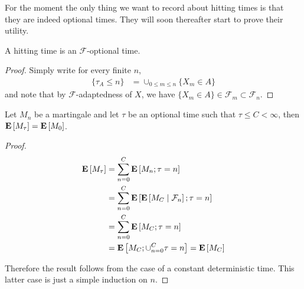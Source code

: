 For the moment the only thing we want to record about hitting times is
that they are indeed optional times.  They will soon thereafter start to prove their utility.
\begin{lem}\label{HittingTimesDiscrete}A hitting time is an
  $\mathcal{F}$-optional time.
\end{lem}
\begin{proof}
Simply write for every finite $n$,
\begin{align*}
\lbrace \tau_A \leq n \rbrace &= \cup_{0 \leq m \leq n} \lbrace X_m
\in A \rbrace
\end{align*}
and note that by $\mathcal{F}$-adaptedness of $X$, we have $\lbrace X_m
\in A \rbrace \in \mathcal{F}_m \subset \mathcal{F}_n$.
\end{proof}

\begin{lem}\label{ExpectationStoppedMartingaleDiscrete}Let $M_n$ be a martingale and let $\tau$ be an optional
  time such that $\tau \leq C < \infty$, then $\expectation{M_\tau} =
  \expectation{M_0}$.
\end{lem}
\begin{proof}
\begin{align*}
\expectation{M_\tau} &= \sum_{n=0}^C \expectation{M_n ; \tau=n} \\
&=\sum_{n=0}^C \expectation{\cexpectationlong{\mathcal{F}_n}{M_C} ;
  \tau=n} \\
&=\sum_{n=0}^C \expectation{M_C ;
  \tau=n} \\
&=\expectation{M_C ;
  \cup_{n=0}^C \tau=n} = \expectation{M_C}\\
\end{align*}

Therefore the result follows from the case of a constant deterministic
time.  This latter case is just a simple induction on $n$.
\end{proof}


